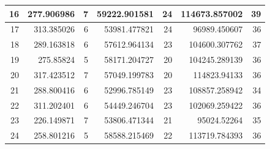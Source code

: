 \begin{table}
\begin{adjustwidth}{}{}
{{\begin{tabular}{|r|r|r|r|r|r|r|}
\hline
16                                         & 277.906986                   & 7                                     & 59222.901581                   & 24                                    & 114673.857002                & 39                                     \\ 
\hline
17                                         & 313.385026                   & 6                                     & 53981.477821                   & 24                                    & 96989.450607                 & 36                                     \\ 
\hline
18                                         & 289.163818                   & 6                                     & 57612.964134                   & 23                                    & 104600.307762                & 37                                     \\ 
\hline
19                                         & 275.85824                    & 5                                     & 58171.204727                   & 20                                    & 104245.289139                & 36                                     \\ 
\hline
20                                         & 317.423512                   & 7                                     & 57049.199783                   & 20                                    & 114823.94133                 & 36                                     \\ 
\hline
21                                         & 288.800416                   & 6                                     & 52996.785149                   & 23                                    & 108857.258942                & 34                                     \\ 
\hline
22                                         & 311.202401                   & 6                                     & 54449.246704                   & 23                                    & 102069.259422                & 36                                     \\ 
\hline
23                                         & 226.149871                   & 7                                     & 53806.471344                   & 21                                    & 95024.52264                  & 35                                     \\ 
\hline
24                                         & 258.801216                   & 5                                     & 58588.215469                   & 22                                    & 113719.784393                & 36                                     \\ 

\end{tabular}}}
\end{adjustwidth}
\end{table}
